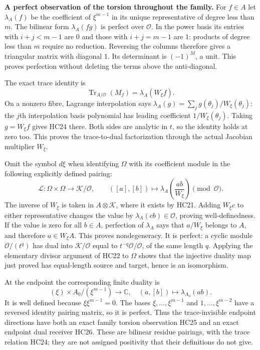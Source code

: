 \HC\textbf{A perfect observation of the torsion throughout the family.}
For $f\in A$ let $\lambda_A(f)$ be the coefficient of
$\xi^{m-1}$ in its unique representative of degree less than $m$.
The bilinear form $\lambda_A(fg)$ is perfect over $\mathcal O$.
In the power basis its entries with $i+j<m-1$ are $0$
and those with $i+j=m-1$ are $1$: products of degree less than
$m$ require no reduction. Reversing the columns therefore gives
a triangular matrix with diagonal $1$. Its determinant is
$(-1)^M$, a unit. This proves perfection without deleting the
terms above the anti-diagonal.

The exact trace identity is
\[
 \operatorname{Tr}_{A/\mathcal O}(M_f)
       =\lambda_A(W_\xi f).
 \tag{HC24}
\]
On a nonzero fibre, Lagrange interpolation says
$\lambda_A(g)=\sum_j g(\theta_j)/W_\xi(\theta_j)$:
the $j$th interpolation basis polynomial has leading coefficient
$1/W_\xi(\theta_j)$. Taking $g=W_\xi f$ gives HC24 there.
Both sides are analytic in $t$, so the identity holds at zero too.
This proves the trace-to-dual factorization through the actual
Jacobian multiplier $W_\xi$.

Omit the symbol $d\xi$ when identifying $\Omega$ with its coefficient
module in the following explicitly defined pairing:
\[
 \mathscr L:\Omega\times\Omega\longrightarrow\mathcal K/\mathcal O,
 \qquad([a],[b])\longmapsto
      \lambda_A\left(\frac{ab}{W_\xi}\right)\pmod{\mathcal O}.
 \tag{HC25}
\]
The inverse of $W_\xi$ is taken in $A\otimes\mathcal K$, where
it exists by HC21. Adding $W_\xi c$ to either representative
changes the value by $\lambda_A(cb)\in\mathcal O$, proving
well-definedness. If the value is zero for all $b\in A$, perfection
of $\lambda_A$ says that $a/W_\xi$ belongs to $A$, and therefore
$a\in W_\xi A$. This proves nondegeneracy. It is perfect: a
cyclic module $\mathcal O/(t^q)$ has dual into
$\mathcal K/\mathcal O$ equal to $t^{-q}\mathcal O/\mathcal O$,
of the same length $q$. Applying the elementary divisor argument
of HC22 to $\Omega$ shows that the injective duality map just
proved has equal-length source and target, hence is an isomorphism.

At the endpoint the corresponding finite duality is
\[
 (\xi)\times A_0/(\xi^{m-1})\longrightarrow\mathbb C,
           \quad(a,[b])\longmapsto\lambda_{A_0}(ab).
 \tag{HC26}
\]
It is well defined because $\xi\xi^{m-1}=0$. The bases
$\xi,\ldots,\xi^{m-1}$ and $1,\ldots,\xi^{m-2}$ have a
reversed identity pairing matrix, so it is perfect. Thus the
trace-invisible endpoint directions have both an exact family
torsion observation HC25 and an exact endpoint dual receiver HC26.
These are bilinear residue pairings, with the trace relation HC24;
they are not assigned positivity that their definitions do not give.

